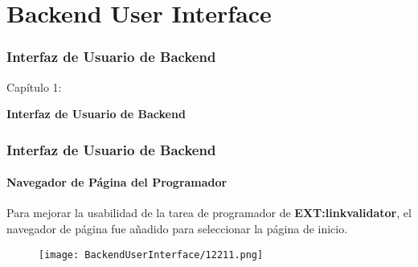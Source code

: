 %

\section{Backend User Interface}
\begin{frame}[fragile]
	\frametitle{Interfaz de Usuario de Backend}

	\begin{center}\huge{Capítulo 1:}\end{center}
	\begin{center}\huge{\color{typo3darkgrey}\textbf{Interfaz de Usuario de Backend}}\end{center}

\end{frame}

\begin{frame}[fragile]
	\frametitle{Interfaz de Usuario de Backend}
	\framesubtitle{Navegador de Página del Programador}

	Para mejorar la usabilidad de la tarea de programador de \textbf{EXT:linkvalidator},
	el navegador de página fue añadido para seleccionar la página de inicio.

	\begin{figure}\vspace{-0.2cm}
		\texttt{[image: BackendUserInterface/12211.png]}
	\end{figure}

\end{frame}

